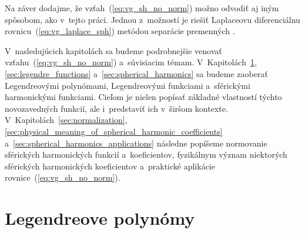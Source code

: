 \documentclass[a4paper, 12pt]{book}
\begin{document}
Na záver dodajme, že vzťah~(\ref{eq:vg_sh_no_norm}) možno odvodiť aj iným 
spôsobom, ako v~tejto práci.  Jednou z~možností je riešiť Laplaceovu 
diferenciálnu rovnicu~(\ref{eq:vg_laplace_sph}) metódou separácie premenných 
\citep[napríklad][]{MoritzPhysicalGeodesy,Janak2006}.

V~nasledujúcich kapitolách sa budeme podrobnejšie venovať 
vzťahu~(\ref{eq:vg_sh_no_norm}) a~súvisiacim témam.  
V~Kapitolách~\ref{sec:legendre_polynomials}, \ref{sec:legendre_functions} 
a~\ref{sec:spherical_harmonics} sa budeme zaoberať Legendreovými polynómami, 
Legendreovými funkciami a~sférickými harmonickými funkciami.  Cieľom je nielen 
popísať základné vlastností týchto novozavedných funkcií, ale i~predstaviť ich 
v~širšom kontexte.  V~Kapitolách~\ref{sec:normalization}, 
\ref{sec:physical_meaning_of_spherical_harmonic_coefficients} 
a~\ref{sec:spherical_harmonics_applications} následne popíšeme normovanie 
sférických harmonických funkcií a~koeficientov, fyzikálnym význam niektorých 
sférických harmonických koeficientov a~praktické aplikácie 
rovnice~(\ref{eq:vg_sh_no_norm}).






\section{Legendreove polynómy}
\label{sec:legendre_polynomials}
\end{document}
